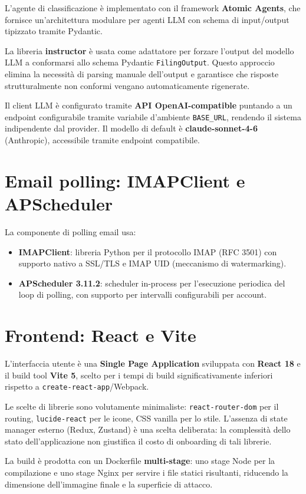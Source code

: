 L'agente di classificazione \`e implementato con il framework \textbf{Atomic Agents},
che fornisce un'architettura modulare per agenti LLM con schema di input/output
tipizzato tramite Pydantic.

La libreria \textbf{instructor} \`e usata come adattatore per forzare l'output del modello
LLM a conformarsi allo schema Pydantic \texttt{FilingOutput}. Questo approccio elimina
la necessit\`a di parsing manuale dell'output e garantisce che risposte strutturalmente
non conformi vengano automaticamente rigenerate.

Il client LLM \`e configurato tramite \textbf{API OpenAI-compatible} puntando a un
endpoint configurabile tramite variabile d'ambiente \texttt{BASE\_URL}, rendendo il
sistema indipendente dal provider. Il modello di default \`e
\textbf{claude-sonnet-4-6} (Anthropic), accessibile tramite endpoint compatibile.

\section{Email polling: IMAPClient e APScheduler}
\label{sec:stack_email}

La componente di polling email usa:
\begin{itemize}[leftmargin=*]
    \item \textbf{IMAPClient}: libreria Python per il protocollo IMAP (RFC 3501) con
          supporto nativo a SSL/TLS e IMAP UID (meccanismo di watermarking).
    \item \textbf{APScheduler 3.11.2}: scheduler in-process per l'esecuzione periodica
          del loop di polling, con supporto per intervalli configurabili per account.
\end{itemize}

\section{Frontend: React e Vite}
\label{sec:stack_frontend}

L'interfaccia utente \`e una \textbf{Single Page Application} sviluppata con \textbf{React 18}
e il build tool \textbf{Vite 5}, scelto per i tempi di build significativamente inferiori
rispetto a \texttt{create-react-app}/Webpack.

Le scelte di librerie sono volutamente minimaliste: \texttt{react-router-dom} per il routing,
\texttt{lucide-react} per le icone, CSS vanilla per lo stile. L'assenza di state manager
esterno (Redux, Zustand) \`e una scelta deliberata: la complessit\`a dello stato dell'applicazione
non giustifica il costo di onboarding di tali librerie.

La build \`e prodotta con un Dockerfile \textbf{multi-stage}: uno stage Node per la compilazione
e uno stage Nginx per servire i file statici risultanti, riducendo la dimensione dell'immagine
finale e la superficie di attacco.
